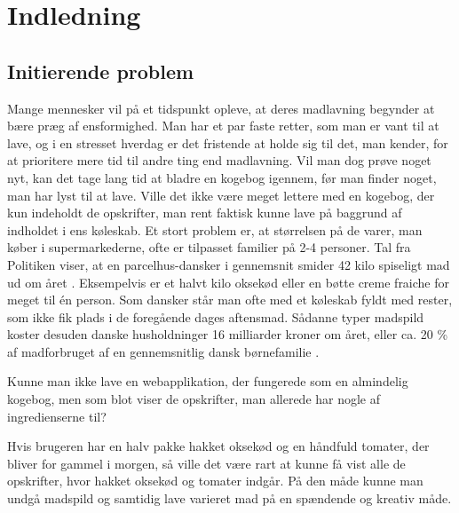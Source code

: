\chapter{Indledning}
\label{chap:indledning}

\section{Initierende problem}
Mange mennesker vil på et tidspunkt opleve, at deres madlavning begynder at bære præg af ensformighed. Man har et par faste retter, som man er vant til at lave, og i en stresset hverdag er det fristende at holde sig til det, man kender, for at prioritere mere tid til andre ting end madlavning. Vil man dog prøve noget nyt, kan det tage lang tid at bladre en kogebog igennem, før man finder noget, man har lyst til at lave. Ville det ikke være meget lettere med en kogebog, der kun indeholdt de opskrifter, man rent faktisk kunne lave på baggrund af indholdet i ens køleskab. Et stort problem er, at størrelsen på de varer, man køber i supermarkederne, ofte er tilpasset familier på 2-4 personer. Tal fra Politiken viser, at en parcelhus-dansker i gennemsnit smider 42 kilo spiseligt mad ud om året \cite{madspildpol}. Eksempelvis er et halvt kilo oksekød eller en bøtte creme fraiche for meget til én person. Som dansker står man ofte med et køleskab fyldt med rester, som ikke fik plads i de foregående dages aftensmad. Sådanne typer madspild koster desuden danske husholdninger 16 milliarder kroner om året, eller ca. 20 \% af madforbruget af en gennemsnitlig dansk børnefamilie \cite{madspild16}. 

Kunne man ikke lave en webapplikation, der fungerede som en almindelig kogebog, men som blot viser de opskrifter, man allerede har nogle af ingredienserne til? 

Hvis brugeren har en halv pakke hakket oksekød og en håndfuld tomater, der bliver for gammel i morgen, så ville det være rart at kunne få vist alle de opskrifter, hvor hakket oksekød og tomater indgår. På den måde kunne man undgå madspild og samtidig lave varieret mad på en spændende og kreativ måde.
